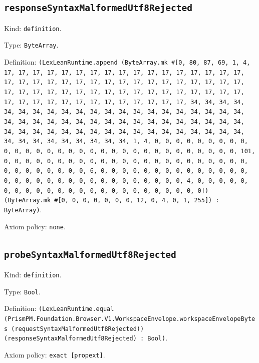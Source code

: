 \documentclass[11pt]{article}
\begin{document}
\subsection*{\texttt{responseSyntaxMalformedUtf8Rejected}}
\noindent Kind: \texttt{definition}.\par
\noindent Type: \texttt{ByteArray}.\par
\noindent Definition: \texttt{(LexLeanRuntime.append (ByteArray.mk \#[0, 80, 87, 69, 1, 4, 17, 17, 17, 17, 17, 17, 17, 17, 17, 17, 17, 17, 17, 17, 17, 17, 17, 17, 17, 17, 17, 17, 17, 17, 17, 17, 17, 17, 17, 17, 17, 17, 17, 17, 17, 17, 17, 17, 17, 17, 17, 17, 17, 17, 17, 17, 17, 17, 17, 17, 17, 17, 17, 17, 17, 17, 17, 17, 17, 17, 17, 17, 17, 17, 34, 34, 34, 34, 34, 34, 34, 34, 34, 34, 34, 34, 34, 34, 34, 34, 34, 34, 34, 34, 34, 34, 34, 34, 34, 34, 34, 34, 34, 34, 34, 34, 34, 34, 34, 34, 34, 34, 34, 34, 34, 34, 34, 34, 34, 34, 34, 34, 34, 34, 34, 34, 34, 34, 34, 34, 34, 34, 34, 34, 34, 34, 34, 34, 1, 4, 0, 0, 0, 0, 0, 0, 0, 0, 0, 0, 0, 0, 0, 0, 0, 0, 0, 0, 0, 0, 0, 0, 0, 0, 0, 0, 0, 0, 0, 0, 0, 101, 0, 0, 0, 0, 0, 0, 0, 0, 0, 0, 0, 0, 0, 0, 0, 0, 0, 0, 0, 0, 0, 0, 0, 0, 0, 0, 0, 0, 0, 0, 0, 6, 0, 0, 0, 0, 0, 0, 0, 0, 0, 0, 0, 0, 0, 0, 0, 0, 0, 0, 0, 0, 0, 0, 0, 0, 0, 0, 0, 0, 0, 0, 0, 4, 0, 0, 0, 0, 0, 0, 0, 0, 0, 0, 0, 0, 0, 0, 0, 0, 0, 0, 0, 0, 0, 0, 0, 0]) (ByteArray.mk \#[0, 0, 0, 0, 0, 0, 0, 12, 0, 4, 0, 1, 255]) : ByteArray)}.\par
\noindent Axiom policy: \texttt{none}.\par
\subsection*{\texttt{probeSyntaxMalformedUtf8Rejected}}
\noindent Kind: \texttt{definition}.\par
\noindent Type: \texttt{Bool}.\par
\noindent Definition: \texttt{(LexLeanRuntime.equal (PrismPM.Foundation.Browser.V1.WorkspaceEnvelope.workspaceEnvelopeBytes (requestSyntaxMalformedUtf8Rejected)) (responseSyntaxMalformedUtf8Rejected) : Bool)}.\par
\noindent Axiom policy: \texttt{exact [propext]}.\par
\end{document}
